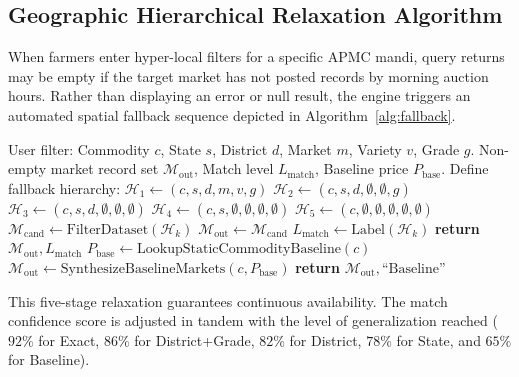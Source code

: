 \documentclass[conference]{IEEEtran}
\begin{document}
\subsection{Geographic Hierarchical Relaxation Algorithm}
When farmers enter hyper-local filters for a specific APMC mandi, query returns may be empty if the target market has not posted records by morning auction hours. Rather than displaying an error or null result, the engine triggers an automated spatial fallback sequence depicted in Algorithm~\ref{alg:fallback}.

\begin{algorithm}[htbp]
\caption{Hierarchical Spatial Fallback Resolution}
\label{alg:fallback}
\begin{algorithmic}[1]
\REQUIRE User filter: Commodity $c$, State $s$, District $d$, Market $m$, Variety $v$, Grade $g$.
\ENSURE Non-empty market record set $\mathcal{M}_{\text{out}}$, Match level $L_{\text{match}}$, Baseline price $P_{\text{base}}$.
\STATE Define fallback hierarchy:
\STATE $\mathcal{H}_1 \leftarrow (c, s, d, m, v, g)$ 
\STATE $\mathcal{H}_2 \leftarrow (c, s, d, \emptyset, \emptyset, g)$ 
\STATE $\mathcal{H}_3 \leftarrow (c, s, d, \emptyset, \emptyset, \emptyset)$ 
\STATE $\mathcal{H}_4 \leftarrow (c, s, \emptyset, \emptyset, \emptyset, \emptyset)$ 
\STATE $\mathcal{H}_5 \leftarrow (c, \emptyset, \emptyset, \emptyset, \emptyset, \emptyset)$ 
    \STATE $\mathcal{M}_{\text{cand}} \leftarrow \text{FilterDataset}(\mathcal{H}_k)$
        \STATE $\mathcal{M}_{\text{out}} \leftarrow \mathcal{M}_{\text{cand}}$
        \STATE $L_{\text{match}} \leftarrow \text{Label}(\mathcal{H}_k)$
        \STATE \textbf{return} $\mathcal{M}_{\text{out}}, L_{\text{match}}$
    \ENDIF
\ENDFOR
\STATE {}
\STATE $P_{\text{base}} \leftarrow \text{LookupStaticCommodityBaseline}(c)$
\STATE $\mathcal{M}_{\text{out}} \leftarrow \text{SynthesizeBaselineMarkets}(c, P_{\text{base}})$
\STATE \textbf{return} $\mathcal{M}_{\text{out}}, \text{``Baseline''}$
\end{algorithmic}
\end{algorithm}

This five-stage relaxation guarantees continuous availability. The match confidence score is adjusted in tandem with the level of generalization reached ($92\%$ for Exact, $86\%$ for District+Grade, $82\%$ for District, $78\%$ for State, and $65\%$ for Baseline).
\end{document}
